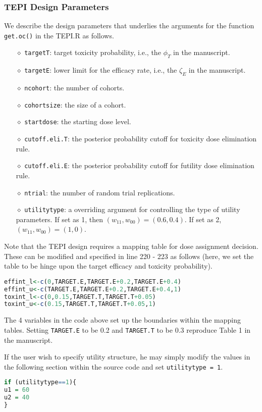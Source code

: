 \documentclass[notitlepage]{article}
\begin{document}
 \subsubsection{TEPI Design Parameters}
 We describe the design parameters that underlies the arguments for the function \texttt{get.oc()} in the TEPI.R as follows.
 \begin{itemize}
\item[$\diamond$] \texttt{targetT}: target toxicity probability, i.e., the $\phi_T$ in the manuscript.
\item[$\diamond$] \texttt{targetE}: lower limit for the efficacy rate, i.e., the $\zeta_E$ in the manuscript.
\item[$\diamond$] \texttt{ncohort}: the number of cohorts.
\item[$\diamond$] \texttt{cohortsize}: the size of a cohort.
\item[$\diamond$] \texttt{startdose}: the starting dose level.
\item[$\diamond$] \texttt{cutoff.eli.T}: the posterior probability cutoff for toxicity dose elimination rule.
\item[$\diamond$] \texttt{cutoff.eli.E}: the posterior probability cutoff for futility dose elimination rule.
\item[$\diamond$] \texttt{ntrial}: the number of random trial replications.
\item[$\diamond$] \texttt{utilitytype}: a overriding argument for controlling the type of utility parameters. If set as 1, then $(w_{11},w_{00}) = (0.6,0.4)$. If set as 2, $(w_{11},w_{00}) = (1,0)$.
\end{itemize}
Note that the TEPI design requires a mapping table for dose assignment decision. These can be modified and specified in line 220 - 223 as follows (here, we set the table to be hinge upon the target efficacy and toxicity probability).
\begin{lstlisting}[language=R]
effint_l<-c(0,TARGET.E,TARGET.E+0.2,TARGET.E+0.4)
effint_u<-c(TARGET.E,TARGET.E+0.2,TARGET.E+0.4,1)
toxint_l<-c(0,0.15,TARGET.T,TARGET.T+0.05)
toxint_u<-c(0.15,TARGET.T,TARGET.T+0.05,1)
\end{lstlisting}
The 4 variables in the code above set up the boundaries within the mapping tables. Setting \texttt{TARGET.E} to be 0.2 and \texttt{TARGET.T} to be 0.3 reproduce Table 1 in the manuscript.

If the user wish to specify utility structure, he may simply modify the values in the following section within the source code and set \texttt{utilitytype = 1}.
\begin{lstlisting}[language=R]
if (utilitytype==1){
u1 = 60
u2 = 40
}
\end{lstlisting}
\end{document}
